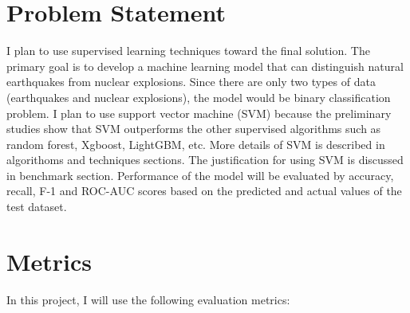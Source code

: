 \documentclass[12pt]{article}
\begin{document}
        \section{Problem Statement}
        I plan to use supervised learning techniques toward the final solution. The primary goal is to develop a machine learning model that can distinguish natural earthquakes from nuclear explosions. Since there are only two types of data (earthquakes and nuclear explosions), the model would be binary classification problem. I plan to use support vector machine (SVM) because the preliminary studies show that SVM outperforms the other supervised algorithms such as random forest, Xgboost, LightGBM, etc. More details of SVM is described in algorithoms and techniques sections. The justification for using SVM is discussed in benchmark section. Performance of the model will be evaluated by accuracy, recall, F-1 and ROC-AUC scores based on the predicted and actual values of the test dataset.
    
    
        \section{Metrics}
        In this project, I will use the following evaluation metrics:  
        
\end{document}
